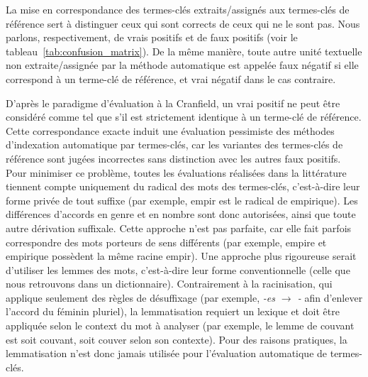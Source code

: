     La mise en correspondance des termes-clés extraits/assignés aux termes-clés
    de référence sert à distinguer ceux qui sont corrects de ceux qui ne le sont
    pas. Nous parlons, respectivement, de vrais positifs et de faux positifs
    (voir le
    tableau~\ref{tab:confusion_matrix}). De la même manière, toute autre unité
    textuelle non extraite/assignée par la méthode automatique est appelée faux
    négatif si elle correspond à un terme-clé de référence, et vrai négatif dans
    le cas contraire.
    
    D'après le paradigme d'évaluation \og{}à la Cranfield\fg{}, un
    vrai positif ne peut être considéré comme tel que s'il est strictement
    identique à un terme-clé de référence. Cette correspondance \og{}exacte\fg{}
    induit une évaluation pessimiste des méthodes d'indexation automatique par
    termes-clés, car les variantes des termes-clés de référence sont jugées
    incorrectes sans distinction avec les autres faux positifs. Pour minimiser
    ce problème, toutes les évaluations réalisées dans la littérature tiennent
    compte uniquement du radical des mots des termes-clés, c'est-à-dire leur
    forme privée de tout suffixe (par exemple, \og{}empir\fg{} est le radical de
    \og{}empirique\fg{}). Les différences d'accords en genre et en
    nombre sont donc autorisées, ainsi que toute autre dérivation suffixale.
    Cette approche n'est pas parfaite, car elle fait parfois correspondre des
    mots porteurs de sens différents (par exemple, \og{}empire\fg{} et
    \og{}empirique\fg{} possèdent la même racine \og{}empir\fg{}). Une approche
    plus rigoureuse serait d'utiliser les lemmes des mots, c'est-à-dire leur
    forme conventionnelle (celle que nous retrouvons dans  un dictionnaire).
    Contrairement à la racinisation, qui applique seulement des règles de
    désuffixage (par exemple, \textit{-es $\rightarrow$ -} afin d'enlever l'accord du
    féminin pluriel), la lemmatisation requiert un lexique et doit être
    appliquée selon le context du mot à analyser (par exemple, le lemme de
    \og{}couvant\fg{} est soit \og{}couvant\fg{}, soit \og{}couver\fg{} selon
    son contexte). Pour des raisons pratiques, la lemmatisation n'est donc jamais
    utilisée pour l'évaluation automatique de termes-clés.
